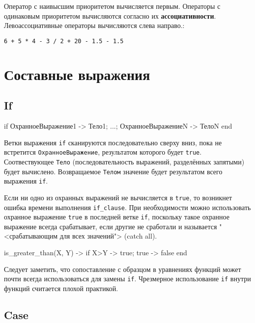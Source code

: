 Оператор с наивысшим приоритетом вычисляется первым. Операторы с одинаковым 
приоритетом вычисляются согласно их \textbf{ассоциативности}. Левоассоциативные
операторы вычисляются слева направо.:

\texttt{6 + 5 * 4 - 3 / 2   + 20 - 1.5   - 1.5  }



\section{Составные выражения}


\subsection{If}

\begin{erlangru}
if
    ОхранноеВыражение1 ->
        Тело1;
    ...;
    ОхранноеВыражениеN ->
        ТелоN          %
end
\end{erlangru}

Ветки выражения \texttt{if} сканируются последовательно сверху вниз, пока не 
встретится \texttt{ОхранноеВыражение}, результатом которого будет \texttt{true}.
Соотвествующее \texttt{Тело} (последовательность выражений, разделённых запятыми)
будет вычислено. Возвращаемое \texttt{Телом} значение будет результатом всего 
выражения \texttt{if}.

Если ни одно из охранных выражений не вычисляется в \texttt{true}, то возникнет
ошибка времени выполнения \texttt{if\_clause}. При необходимости можно 
использовать охранное выражение \texttt{true} в последней ветке \texttt{if}, 
поскольку такое охранное выражение всегда срабатывает, если другие не сработали и
называется "<срабатывающим для всех значений"> (catch all).

\begin{erlang}
is_greater_than(X, Y) ->
    if
        X>Y ->
            true;
        true ->                 %
            false
    end
\end{erlang}

Следует заметить, что сопоставление с образцом в уравнениях функций может почти
всегда использоваться для замены \texttt{if}. Чрезмерное использование \texttt{if}
внутри функций считается плохой практикой.


\subsection{Case}

